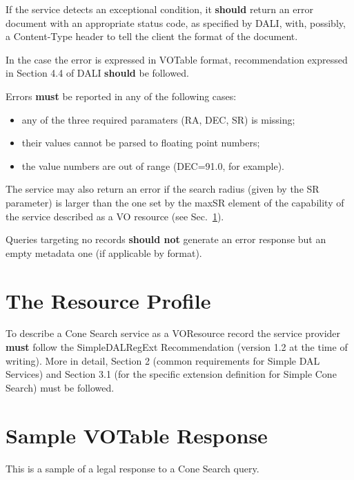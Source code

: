 \documentclass[11pt,a4paper]{ivoa}
\begin{document}
If the service detects an exceptional condition, it \textbf{should} return
an error document with an appropriate status code, as specified by DALI,
with, possibly, a Content-Type header to tell the client the format of
the document.

In the case the error is expressed in VOTable format, recommendation
expressed in Section 4.4 of DALI \textbf{should} be followed.

Errors \textbf{must} be reported in any of the following cases:
\begin{itemize}
	\item any of the three required paramaters (RA, DEC, SR) is missing;
	\item	their values cannot be parsed to floating point numbers;
	\item the value numbers are out of range (DEC=91.0, for example).
\end{itemize}

The service may also return an error if the search radius (given by the
SR parameter) is larger than the one set by the maxSR element of the
capability of the service described as a VO resource (see
Sec.~\ref{sec:3}).

Queries targeting no records \textbf{should not} generate an error
response but an empty metadata one (if applicable by format).

\section{The Resource Profile}
\label{sec:3} 

To describe a Cone Search service as a VOResource record the service
provider \textbf{must} follow the 
SimpleDALRegExt\citep{2022ivoa.spec.0222D} Recommendation (version 1.2
at the time of writing).
More in detail, Section 2 (common requirements for Simple DAL Services)
and Section 3.1 (for the specific extension definition for
Simple Cone Search) must be followed.

\appendix

\section{Sample VOTable Response}
\label{appendix:a}

This is a sample of a legal response to a Cone Search query.
\end{document}
